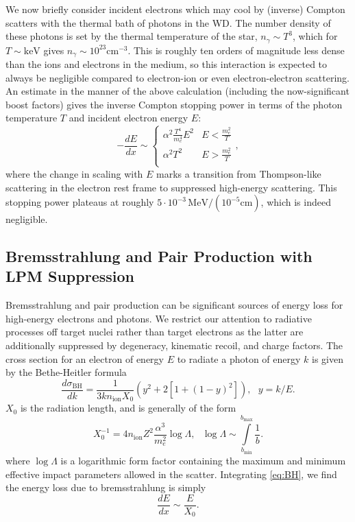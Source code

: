 \documentclass[twocolumn,showpacs,preprintnumbers,amsmath,amssymb,prd]{revtex4}
\newcommand{\MeV}{\text{MeV}}
\newcommand{\cm}{\text{cm}}
\begin{document}
\begin{appendices}
We now briefly consider incident electrons which may cool by (inverse) Compton scatters with the thermal bath of photons in the WD.  
The number density of these photons is set by the thermal temperature of the star, $n_\gamma \sim T^3$, which for $T \sim \text{keV}$ gives $n_\gamma \sim 10^{23} \cm^{-3}$.
This is roughly ten orders of magnitude less dense than the ions and electrons in the medium, so this interaction is expected to always be negligible compared to electron-ion or even electron-electron scattering.
An estimate in the manner of the above calculation (including the now-significant boost factors) gives the inverse Compton stopping power in terms of the photon temperature $T$ and incident electron energy $E$:  
\begin{equation}
\label{eq:invcomptonSP}
  -\frac{dE}{dx} \sim 
  \begin{cases}
    \alpha^2 \frac{T^4}{m_e^4} E^2 & E < \frac{m_e^2}{T} \\
    \alpha^2 T^2 & E > \frac{m_e^2}{T} \\
  \end{cases},
\end{equation}
where the change in scaling with $E$ marks a transition from Thompson-like scattering in the electron rest frame to suppressed high-energy scattering.
This stopping power plateaus at roughly $5\cdot10^{-3}\,\MeV/(10^{-5} \cm)$, which is indeed negligible. 

\subsection*{Bremsstrahlung and Pair Production with LPM Suppression}
Bremsstrahlung and pair production can be significant sources of energy loss for high-energy electrons and photons. We restrict our attention to radiative processes off target nuclei rather than target electrons as the latter are additionally suppressed by degeneracy, kinematic recoil, and charge factors. 
The cross section for an electron of energy $E$ to radiate a photon of energy $k$ is given by the Bethe-Heitler formula
\begin{equation}
\label{eq:BH}
\frac{d \sigma_\text{BH}}{dk} = \frac{1}{3 k n_\text{ion} X_0} (y^2+2 [1+ (1-y)^2]), ~~~ y = k/E.
\end{equation}
$X_0$ is the radiation length, and is generally of the form
\begin{equation}
\label{eq:radiationlength}
X_0^{-1} = 4 n_\text{ion} Z^2 \frac{\alpha^3}{m_e^2} \log{\Lambda}, ~~~ \log{\Lambda} \sim \int \limits_{b_\text{min}}^{b_\text{max}} \frac{1}{b}.
\end{equation}
where $\log{\Lambda}$ is a logarithmic form factor containing the maximum and minimum effective impact parameters allowed in the scatter.
Integrating \eqref{eq:BH}, we find the energy loss due to bremsstrahlung is simply 
\begin{equation}
\frac{dE}{dx} \sim \frac{E}{X_0}.
\end{equation}


\end{appendices}
\end{document}
